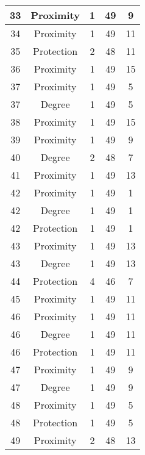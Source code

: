 \documentclass[results.tex]{subfiles}
\begin{document}
\begin{center}
\begin{tabular}{| c || c | c | c | c |}
    \hline
    33 & Proximity & 1 & 49 & 9 \\ 
    \hline
    34 & Proximity & 1 & 49 & 11 \\ 
    \hline
    35 & Protection & 2 & 48 & 11 \\ 
    \hline
    36 & Proximity & 1 & 49 & 15 \\ 
    \hline
    37 & Proximity & 1 & 49 & 5 \\ 
    \hline
    37 & Degree & 1 & 49 & 5 \\ 
    \hline
    38 & Proximity & 1 & 49 & 15 \\ 
    \hline
    39 & Proximity & 1 & 49 & 9 \\ 
    \hline
    40 & Degree & 2 & 48 & 7 \\ 
    \hline
    41 & Proximity & 1 & 49 & 13 \\ 
    \hline
    42 & Proximity & 1 & 49 & 1 \\ 
    \hline
    42 & Degree & 1 & 49 & 1 \\ 
    \hline
    42 & Protection & 1 & 49 & 1 \\ 
    \hline
    43 & Proximity & 1 & 49 & 13 \\ 
    \hline
    43 & Degree & 1 & 49 & 13 \\ 
    \hline
    44 & Protection & 4 & 46 & 7 \\ 
    \hline
    45 & Proximity & 1 & 49 & 11 \\ 
    \hline
    46 & Proximity & 1 & 49 & 11 \\ 
    \hline
    46 & Degree & 1 & 49 & 11 \\ 
    \hline
    46 & Protection & 1 & 49 & 11 \\ 
    \hline
    47 & Proximity & 1 & 49 & 9 \\ 
    \hline
    47 & Degree & 1 & 49 & 9 \\ 
    \hline
    48 & Proximity & 1 & 49 & 5 \\ 
    \hline
    48 & Protection & 1 & 49 & 5 \\ 
    \hline
    49 & Proximity & 2 & 48 & 13 \\ 
    \hline   \end{tabular}
\end{center}
\end{document}

